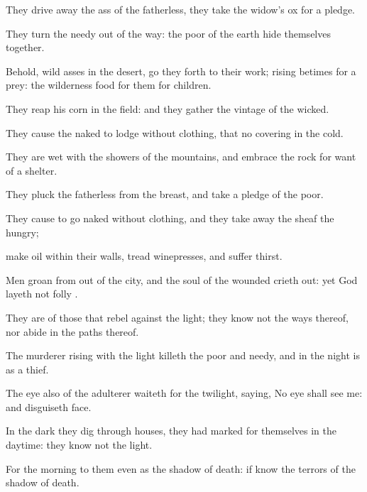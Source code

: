 {They drive
away the
ass of the
fatherless, they
take the
widow’s
ox for a
pledge.

They
turn the
needy out of the
way: the
poor of the
earth
hide themselves
together.

Behold,
{} wild
asses in the
desert, go they
forth to their
work; rising
betimes for a
prey: the
wilderness
{}
food for them
{} for
{}
children.

They
reap
{} his
corn in the
field: and they
gather the
vintage of the
wicked.

They cause the
naked to
lodge without
clothing, that
{} no
covering in the
cold.

They are
wet with the
showers of the
mountains, and
embrace the
rock for want of a
shelter.

They
pluck the
fatherless from the
breast, and take a
pledge of the
poor.

They cause
{} to
go
naked without
clothing, and they take
away the
sheaf
{} the
hungry;

 make
oil
within their
walls,
{}
tread
{}
winepresses, and suffer
thirst.

Men
groan from out of the
city, and the
soul of the
wounded crieth
out: yet
God
layeth not
folly
{}.


\par }{\PP {}They are of those that
rebel against the
light; they
know not the
ways thereof, nor
abide in the
paths thereof.

The
murderer
rising with the
light
killeth the
poor and
needy, and in the
night is as a
thief.

The
eye also of the
adulterer
waiteth for the
twilight,
saying, No
eye shall
see me: and
disguiseth
{}
face.

In the
dark they dig
through
houses,
{} they had
marked for themselves in the
daytime: they
know not the
light.

For the
morning
{} to them even
as the shadow of
death: if
{}
know
{} the
terrors of the shadow of
death.


}
